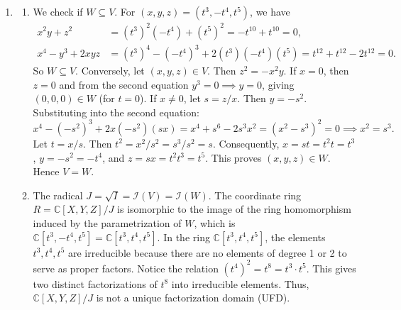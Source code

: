 \documentclass{article}
\begin{document}
\begin{enumerate}[label=\fbox{\arabic*}]
  \item %
        \begin{enumerate}[label=(\arabic*)]
          \item We check if $W \subseteq V$. For $(x, y, z) = (t^3, -t^4, t^5)$, we have
                \begin{align*}
                  x^2y + z^2       & = (t^3)^2(-t^4) + (t^5)^2 = -t^{10} + t^{10} = 0,                         \\
                  x^4 - y^3 + 2xyz & = (t^3)^4 - (-t^4)^3 + 2(t^3)(-t^4)(t^5) = t^{12} + t^{12} - 2t^{12} = 0.
                \end{align*}
                So $W \subseteq V$.
                Conversely, let $(x, y, z) \in V$. Then $z^2 = -x^2y$.
                If $x = 0$, then $z = 0$ and from the second equation $y^3 = 0 \implies y = 0$, giving $(0,0,0) \in W$ (for $t=0$).
                If $x \neq 0$, let $s = z/x$. Then $y = -s^2$. Substituting into the second equation:
                \[
                  x^4 - (-s^2)^3 + 2x(-s^2)(sx) = x^4 + s^6 - 2s^3x^2 = (x^2 - s^3)^2 = 0 \implies x^2 = s^3.
                \]
                Let $t = x/s$. Then $t^2 = x^2/s^2 = s^3/s^2 = s$.
                Consequently, $x = st = t^2 t = t^3$, $y = -s^2 = -t^4$, and $z = sx = t^2 t^3 = t^5$.
                This proves $(x, y, z) \in W$. Hence $V = W$.
          \item The radical $J = \sqrt{I} = \mathcal{I}(V) = \mathcal{I}(W)$. The coordinate ring $R = \mathbb{C}[X, Y, Z]/J$ is isomorphic to the image of the ring homomorphism induced by the parametrization of $W$, which is $\mathbb{C}[t^3, -t^4, t^5] = \mathbb{C}[t^3, t^4, t^5]$.
                In the ring $\mathbb{C}[t^3, t^4, t^5]$, the elements $t^3, t^4, t^5$ are irreducible because there are no elements of degree 1 or 2 to serve as proper factors.
                Notice the relation $(t^4)^2 = t^8 = t^3 \cdot t^5$.
                This gives two distinct factorizations of $t^8$ into irreducible elements. Thus, $\mathbb{C}[X, Y, Z]/J$ is not a unique factorization domain (UFD).
        \end{enumerate}


\end{enumerate}
\end{document}
